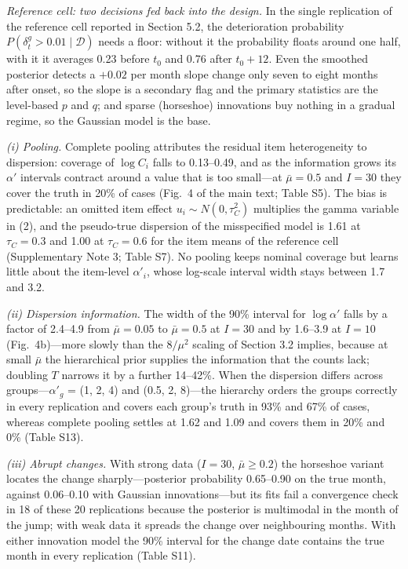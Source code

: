 \textit{Reference cell: two decisions fed back into the design.} In the single replication of the reference cell reported in Section 5.2, the deterioration probability $P(\delta_t^g > 0.01 \mid \mathcal{D})$ needs a floor: without it the probability floats around one half, with it it averages 0.23 before $t_0$ and 0.76 after $t_0 + 12$. Even the smoothed posterior detects a $+0.02$ per month slope change only seven to eight months after onset, so the slope is a secondary flag and the primary statistics are the level-based $p$ and $q$; and sparse (horseshoe) innovations buy nothing in a gradual regime, so the Gaussian model is the base.

\textit{(i) Pooling.} Complete pooling attributes the residual item heterogeneity to dispersion: coverage of $\log C_i$ falls to 0.13–0.49, and as the information grows its $\alpha'$ intervals contract around a value that is too small—at $\bar{\mu} = 0.5$ and $I = 30$ they cover the truth in 20\% of cases (Fig.~4 of the main text; Table S5). The bias is predictable: an omitted item effect $u_i \sim N(0, \tau_C^2)$ multiplies the gamma variable in (2), and the pseudo-true dispersion of the misspecified model is 1.61 at $\tau_C = 0.3$ and 1.00 at $\tau_C = 0.6$ for the item means of the reference cell (Supplementary Note 3; Table S7). No pooling keeps nominal coverage but learns little about the item-level $\alpha'_i$, whose log-scale interval width stays between 1.7 and 3.2.

\textit{(ii) Dispersion information.} The width of the 90\% interval for $\log\alpha'$ falls by a factor of 2.4–4.9 from $\bar{\mu} = 0.05$ to $\bar{\mu} = 0.5$ at $I = 30$ and by 1.6–3.9 at $I = 10$ (Fig.~4b)—more slowly than the $8/\mu^2$ scaling of Section 3.2 implies, because at small $\bar{\mu}$ the hierarchical prior supplies the information that the counts lack; doubling $T$ narrows it by a further 14–42\%. When the dispersion differs across groups—$\alpha'_g$ = (1, 2, 4) and (0.5, 2, 8)—the hierarchy orders the groups correctly in every replication and covers each group's truth in 93\% and 67\% of cases, whereas complete pooling settles at 1.62 and 1.09 and covers them in 20\% and 0\% (Table S13).

\textit{(iii) Abrupt changes.} With strong data ($I = 30$, $\bar{\mu} \geq 0.2$) the horseshoe variant locates the change sharply—posterior probability 0.65–0.90 on the true month, against 0.06–0.10 with Gaussian innovations—but its fits fail a convergence check in 18 of these 20 replications because the posterior is multimodal in the month of the jump; with weak data it spreads the change over neighbouring months. With either innovation model the 90\% interval for the change date contains the true month in every replication (Table S11).

